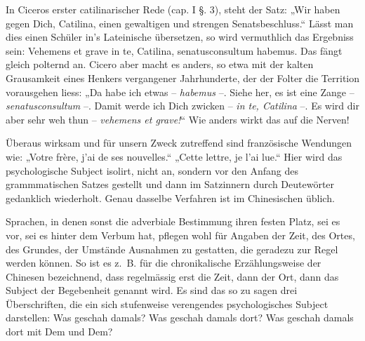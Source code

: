 
In Ciceros erster catilinarischer Rede (cap. I §. 3), steht der Satz: „Wir haben gegen Dich, Catilina, einen gewaltigen und strengen Senatsbeschluss.“ Lässt man dies einen Schüler in’s Lateinische übersetzen, so wird vermuthlich das Ergebniss sein: Vehemens et grave in te, Catilina, senatusconsultum habemus. Das fängt gleich polternd an. Cicero aber macht es anders, so etwa mit der kalten Grausamkeit eines Henkers vergangener Jahrhunderte, der der Folter die Territion vorausgehen liess: „Da habe ich etwas – \textit{habemus} –. Siehe her, es ist eine Zange – \textit{senatusconsultum} –. Damit werde ich Dich zwicken – \textit{in te, Catilina} –. Es wird dir aber sehr weh thun – \textit{vehemens et grave!}“ Wie anders wirkt das auf die Nerven!


Überaus wirksam und für unsern Zweck zutreffend sind französische Wendungen wie: „Votre frère, j’ai de ses nouvelles.“ „Cette lettre, je l’ai lue.“ Hier wird das psychologische Subject isolirt, nicht an, sondern vor den Anfang des grammmatischen Satzes gestellt und dann im Satzinnern durch Deutewörter gedanklich wiederholt. Genau dasselbe Verfahren ist im Chinesischen üblich.

Sprachen, in denen sonst die adverbiale Bestimmung ihren festen Platz, sei es vor, sei es hinter dem Verbum hat, pflegen wohl für Angaben der Zeit, des Ortes, des Grundes, der Umstände Ausnahmen zu gestatten, die geradezu zur Regel werden können. So ist es z.~B. für die chronikalische Erzählungsweise der Chinesen bezeichnend, dass regelmässig erst die Zeit, dann der Ort, dann das Subject der Begebenheit genannt wird. Es sind das so zu sagen drei Überschriften, die ein sich stufenweise verengendes psychologisches Subject darstellen: Was geschah damals? Was geschah damals dort? Was geschah damals dort mit Dem und Dem?

\label{fp.356} \label{sp.372}

